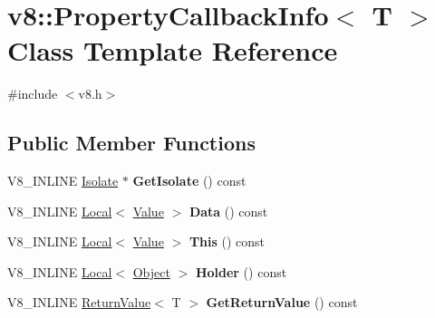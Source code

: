 \hypertarget{classv8_1_1PropertyCallbackInfo}{\section{v8\-:\-:Property\-Callback\-Info$<$ T $>$ Class Template Reference}
\label{classv8_1_1PropertyCallbackInfo}
}


{\ttfamily \#include $<$v8.\-h$>$}

\subsection*{Public Member Functions}
\begin{DoxyCompactItemize}
\item 
\hypertarget{classv8_1_1PropertyCallbackInfo_a066d0c9eee98f80fb78d97961eafa8ad}{V8\-\_\-\-I\-N\-L\-I\-N\-E \hyperlink{classv8_1_1Isolate}{Isolate} $\ast$ {\bfseries Get\-Isolate} () const }\label{classv8_1_1PropertyCallbackInfo_a066d0c9eee98f80fb78d97961eafa8ad}

\item 
\hypertarget{classv8_1_1PropertyCallbackInfo_a64edbaeb902e360fc2a4d353c8c4930f}{V8\-\_\-\-I\-N\-L\-I\-N\-E \hyperlink{classv8_1_1Local}{Local}$<$ \hyperlink{classv8_1_1Value}{Value} $>$ {\bfseries Data} () const }\label{classv8_1_1PropertyCallbackInfo_a64edbaeb902e360fc2a4d353c8c4930f}

\item 
\hypertarget{classv8_1_1PropertyCallbackInfo_a97c1cf0e962504210ddcb1eacd7af85a}{V8\-\_\-\-I\-N\-L\-I\-N\-E \hyperlink{classv8_1_1Local}{Local}$<$ \hyperlink{classv8_1_1Value}{Value} $>$ {\bfseries This} () const }\label{classv8_1_1PropertyCallbackInfo_a97c1cf0e962504210ddcb1eacd7af85a}

\item 
\hypertarget{classv8_1_1PropertyCallbackInfo_a8eb97205ce7bd25b446b03643d02570d}{V8\-\_\-\-I\-N\-L\-I\-N\-E \hyperlink{classv8_1_1Local}{Local}$<$ \hyperlink{classv8_1_1Object}{Object} $>$ {\bfseries Holder} () const }\label{classv8_1_1PropertyCallbackInfo_a8eb97205ce7bd25b446b03643d02570d}

\item 
\hypertarget{classv8_1_1PropertyCallbackInfo_a4e9bc4da66ed3ea21aac7dbb9c11465b}{V8\-\_\-\-I\-N\-L\-I\-N\-E \hyperlink{classv8_1_1ReturnValue}{Return\-Value}$<$ T $>$ {\bfseries Get\-Return\-Value} () const }\label{classv8_1_1PropertyCallbackInfo_a4e9bc4da66ed3ea21aac7dbb9c11465b}

\end{DoxyCompactItemize}
